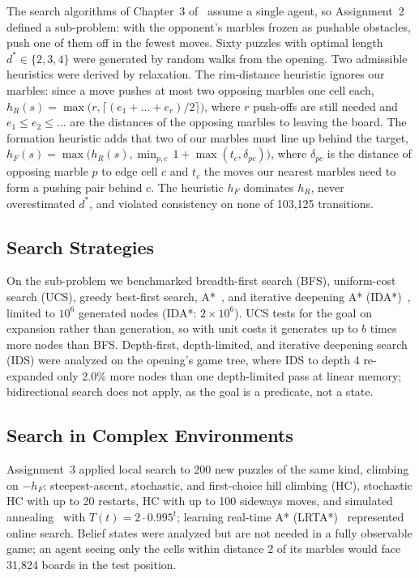 \documentclass[conference,a4paper]{IEEEtran}
\begin{document}
The search algorithms of Chapter~3 of~\cite{russell2021} assume a single agent, so Assignment~2 defined a sub-problem: with the opponent's marbles frozen as pushable obstacles, push one of them off in the fewest moves. Sixty puzzles with optimal length $d^{*}\in\{2,3,4\}$ were generated by random walks from the opening. Two admissible heuristics were derived by relaxation. The rim-distance heuristic ignores our marbles: since a move pushes at most two opposing marbles one cell each, $h_R(s)=\max\bigl(r,\lceil(e_1+\dots+e_r)/2\rceil\bigr)$, where $r$ push-offs are still needed and $e_1\le e_2\le\dots$ are the distances of the opposing marbles to leaving the board. The formation heuristic adds that two of our marbles must line up behind the target, $h_F(s)=\max\bigl(h_R(s),\min_{p,c}\,1+\max(t_c,\delta_{pc})\bigr)$, where $\delta_{pc}$ is the distance of opposing marble $p$ to edge cell $c$ and $t_c$ the moves our nearest marbles need to form a pushing pair behind $c$. The heuristic $h_F$ dominates $h_R$, never overestimated $d^{*}$, and violated consistency on none of 103,125 transitions.

\subsection{Search Strategies}
On the sub-problem we benchmarked breadth-first search (BFS), uniform-cost search (UCS), greedy best-first search, A*~\cite{hart1968}, and iterative deepening A* (IDA*)~\cite{korf1985}, limited to $10^{6}$ generated nodes (IDA*: $2\times10^{6}$). UCS tests for the goal on expansion rather than generation, so with unit costs it generates up to $b$ times more nodes than BFS. Depth-first, depth-limited, and iterative deepening search (IDS) were analyzed on the opening's game tree, where IDS to depth 4 re-expanded only 2.0\% more nodes than one depth-limited pass at linear memory; bidirectional search does not apply, as the goal is a predicate, not a state.

\subsection{Search in Complex Environments}
Assignment~3 applied local search to 200 new puzzles of the same kind, climbing on $-h_F$: steepest-ascent, stochastic, and first-choice hill climbing (HC), stochastic HC with up to 20 restarts, HC with up to 100 sideways moves, and simulated annealing~\cite{kirkpatrick1983} with $T(t)=2\cdot0.995^{t}$; learning real-time A* (LRTA*)~\cite{korf1990} represented online search. Belief states were analyzed but are not needed in a fully observable game; an agent seeing only the cells within distance 2 of its marbles would face 31,824 boards in the test position.
\end{document}
